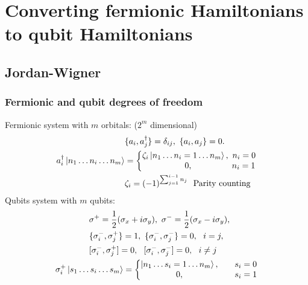\documentclass{beamer}
\renewcommand{\(}{\left(}
\renewcommand{\)}{\right)}
\renewcommand{\[}{\left[}
\renewcommand{\]}{\right]}
\begin{document}
\section{Converting fermionic Hamiltonians to qubit Hamiltonians}
\subsection{Jordan-Wigner}
\begin{frame}
    \frametitle{Fermionic and qubit degrees of freedom} 
    Fermionic system with $m$ orbitals: ($2^m$ dimensional) 
    \begin{align*}
        &\{a_i, a_j^\dagger\} = \delta_{ij}, \ \{a_i, a_j\} = 0. \\
        a^\dagger_i \ket{n_1 \dots n_i \dots n_m} &= \left\{ \begin{matrix}
            \zeta_i\ket{n_1 \dots n_i =1 \dots n_m},\  n_i = 0 \\ 
            \qquad \qquad \quad  0,\ \ \qquad  \qquad   n_i = 1
        \end{matrix} \right. \\ 
        & \zeta_i = (-1)^{\sum_{j=1}^{ i-1} n_j}\ \ \text{Parity counting}
    \end{align*}
    \pause
    Qubits system with $m$ qubits: 
    \begin{align*}
        &\qquad \qquad  \sigma^{+} = \frac{1}{2} (\sigma_x + i\sigma_y  ), \ \sigma^{-} = \frac{1}{2} (\sigma_x - i\sigma_y  ), \\ 
        &\qquad \qquad  \{\sigma^-_i, \sigma_j^{+}\} = 1, \ \{\sigma^-_i, \sigma_j^{-}\}=0, \ \  i = j , \\ 
        &\qquad \qquad  [\sigma^-_i, \sigma_j^{+}] = 0, \ \ [\sigma^-_i, \sigma_j^{-}] = 0, \ \  i \neq j \\ 
        &\sigma^{+}_i \ket{s_1 \dots s_i \dots s_m} = \left\{ \begin{matrix}
            \ket{n_1 \dots s_i = 1 \dots n_m}, && s_i = 0 \\ 
            0, && s_i = 1
        \end{matrix} \right.
    \end{align*}
\end{frame}
\end{document}
